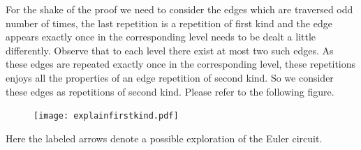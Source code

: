 \documentclass[12pt]{article}
\numberwithin{equation}{section}
\numberwithin{equation}{section}
\theoremstyle{definition}
\renewcommand{\1}{\bf 1}
\begin{document}
\noindent
For the shake of the proof we need to consider the edges which are traversed odd number of times, the last repetition is a repetition of first kind and the edge appears exactly once in the corresponding level needs to be dealt a little differently. Observe that to each level there exist at most two such edges. As these edges are repeated exactly once in the corresponding level, these repetitions enjoys all the properties of an edge repetition of second kind. So we consider these edges as repetitions of second kind. Please refer to the following figure.
\begin{figure}[H]
        \begin{center}
                \texttt{[image: explainfirstkind.pdf]}
        ~ %
      \end{center}   
 \end{figure}
 Here the labeled arrows denote a possible exploration of the Euler circuit.


\end{document}
